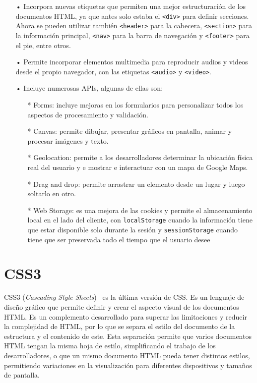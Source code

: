 \documentclass[a4paper, 12pt]{book}
\begin{document}
	\begin{itemize}
	\item[•] Incorpora nuevas etiquetas que permiten una mejor estructuración de los documentos HTML, ya que antes solo estaba el \texttt{<div>} para definir secciones. 
	Ahora se pueden utilizar también \texttt{<header>} para la cabecera, \texttt{<section>} para la información principal, \texttt{<nav>} para la barra de navegación y \texttt{<footer>} para el pie, entre otros.
	\item[•] Permite incorporar elementos multimedia para reproducir audios y videos desde el propio navegador, con las etiquetas \texttt{<audio>} y \texttt{<video>}.
	\item[•] Incluye numerosas APIs, algunas de ellas son:
		\begin{itemize}
		\item[*] Forms: incluye mejoras en los formularios para personalizar todos los aspectos de procesamiento y validación.
		\item[*] Canvas: permite dibujar, presentar gráficos en pantalla, animar y procesar imágenes y texto.
		\item[*] Geolocation: permite a los desarrolladores determinar la ubicación física real del usuario y e mostrar e interactuar con un mapa de Google Maps.
		\item[*] Drag and drop: permite arrastrar un elemento desde un lugar y luego soltarlo en otro.
		\item[*] Web Storage: es una mejora de las cookies y permite el almacenamiento local en el lado del cliente, con \texttt{localStorage} cuando la información tiene que estar disponible solo durante la sesión y \texttt{sessionStorage} cuando tiene que ser preservada todo el tiempo que el usuario desee
		\end{itemize}
	\end{itemize}


\section{CSS3} 
\label{sec:CSS3}

CSS3 (\emph{Cascading Style Sheets})~\cite{gauchat2012gran} es la última versión de CSS. 
Es un lenguaje de diseño gráfico que permite definir y crear el aspecto visual de los documentos HTML. 
Es un complemento desarrollado para superar las limitaciones y reducir la complejidad de HTML, por lo que se separa el estilo del documento de la estructura y el contenido de este. 
Esta separación permite que varios documentos HTML tengan la misma hoja de estilo, simplificando el trabajo de los desarrolladores, o que un mismo documento HTML pueda tener distintos estilos, permitiendo variaciones en la visualización para diferentes dispositivos y tamaños de pantalla.
\end{document}
